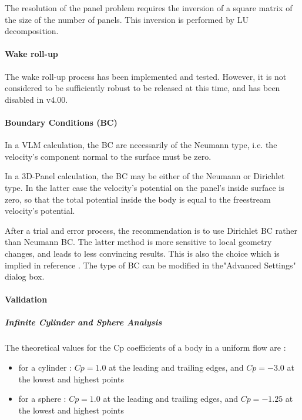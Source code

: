 \documentclass[a4paper,twoside,12pt,dvips]{article}
\begin{document}
The resolution of the panel problem requires the inversion of a square
matrix of the size of the number of panels. This inversion is
performed by LU decomposition.

\paragraph{Wake roll-up}

The wake roll-up process has been implemented and tested. However, it
is not considered to be sufficiently robust to be released at this
time, and has been disabled in v4.00.

\paragraph{Boundary Conditions (BC)}

In a VLM calculation, the BC are necessarily of the Neumann type, i.e.
the velocity's component normal to the surface must be zero.

In a 3D-Panel calculation, the BC may be either of the Neumann or
Dirichlet type. In the latter case the velocity's potential on the
panel's inside surface is zero, so that the total potential inside the
body is equal to the freestream velocity's potential.

After a trial and error process, the recommendation is to use
Dirichlet BC rather than Neumann BC. The latter method is more
sensitive to local geometry changes, and leads to less convincing
results. This is also the choice which is implied in reference
\cite{Maskew}. The type of BC can be modified in the"Advanced
Settings" dialog box.

\paragraph{Validation}

\subparagraph{Infinite Cylinder and Sphere Analysis}

The theoretical values for the Cp coefficients of a body in a uniform
flow are :

\begin{itemize}
\item for a cylinder : $Cp = 1.0$ at the leading and trailing edges, and
$Cp = -3.0$ at the lowest and highest points
\item for a sphere : $Cp = 1.0$ at the leading and trailing edges, and $Cp
= -1.25$ at the lowest and highest points
\end{itemize}
\end{document}
